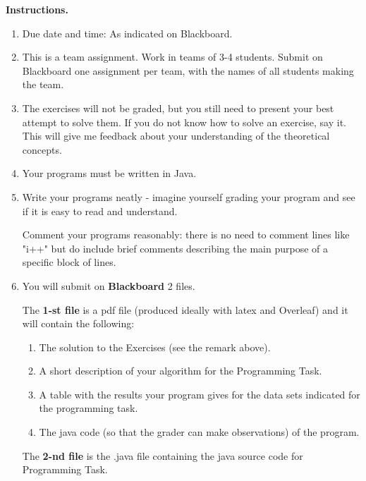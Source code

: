 \documentclass[11pt]{article}
\begin{document}
\vline

\textbf{Instructions.}
\begin{enumerate}
\item Due date and time: As indicated on Blackboard. 
\item This is a team assignment. Work in teams of 3-4 students.  Submit on Blackboard one assignment per team, with the names of all students making the team. 
\item The exercises will not be graded, but you still need to present your best attempt to solve them. If you do not know how to solve an exercise, say it.  This will give me feedback about your understanding of the theoretical concepts.
\item Your programs must be written in Java.

\item Write your programs neatly - imagine yourself grading your program and see if it is easy to read and understand. 

Comment your programs reasonably: there is no need to comment lines like "i++" but do include brief comments describing the main purpose of a specific block of lines.
\item  You will submit on \textbf{Blackboard} 2 files.  

The \textbf{1-st file} is a pdf file (produced ideally with latex and Overleaf) and it will contain the following:
\begin{enumerate}
\item The solution to the Exercises (see the remark above).
\item   A short description of your algorithm for the Programming Task.
\item   A table with the results your program gives  for the data sets indicated for the programming task. 
\item   The java code (so that the grader can make observations) of the  program.
\end{enumerate}


The \textbf{2-nd file} is the .java file containing the java source code for Programming Task.

\end{enumerate}
\newpage
\end{document}
